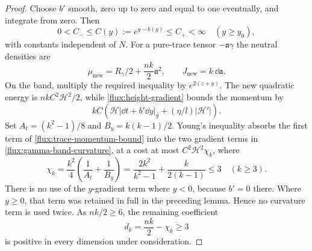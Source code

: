 \begin{proof}
Choose $b'$ smooth, zero up to zero and equal to one eventually, and
integrate from zero.  Then
\begin{equation}
 0<C_-\leq C(y):=e^{y-b(y)}\leq C_+<\infty
 \quad(y\geq y_0),
 \label{flux:C-bounds}
\end{equation}
with constants independent of $N$.
For a pure-trace tensor $-\mathfrak a\gamma$ the neutral densities are
\begin{equation}
 \mu_{\mathrm{new}}=R_\gamma/2+\frac{nk}{2}\mathfrak a^2,
 \qquad J_{\mathrm{new}}=k\,\dd\mathfrak a.
 \label{flux:trace-constraints}
\end{equation}
On the band, multiply the required inequality by $e^{2(z+y)}$.
The new quadratic energy is $nk C^2\mathcal H^2/2$, while
\eqref{flux:height-gradient} bounds the momentum by
\begin{equation}
 kC\left(\mathcal H|\dd t+b'\dd y|_{\bar g}
              +(\eta/l)|\mathcal H'|\right).
 \label{flux:trace-momentum-bound}
\end{equation}
Set $A_t=(k^2-1)/8$ and $B_y=k(k-1)/2$.  Young's inequality absorbs the
first term of \eqref{flux:trace-momentum-bound} into the two gradient
terms in \eqref{flux:gamma-band-curvature}, at a cost at most
$C^2\mathcal H^2\chi_k$, where
\begin{equation}
 \chi_k=\frac{k^2}{4}\left(\frac1{A_t}+\frac1{B_y}\right)
 =\frac{2k^2}{k^2-1}+\frac{k}{2(k-1)}\leq3
 \quad(k\geq3).
 \label{flux:dimension-slack}
\end{equation}
There is no use of the $y$-gradient term where $y<0$, because $b'=0$
there.  Where $y\geq0$, that term was retained in full in the preceding
lemma.  Hence no curvature term is used twice.  As $nk/2\geq6$, the
remaining coefficient
\begin{equation}
 d_k=\frac{nk}{2}-\chi_k\geq3
 \label{flux:positive-slack}
\end{equation}
is positive in every dimension under consideration.


\end{proof}
